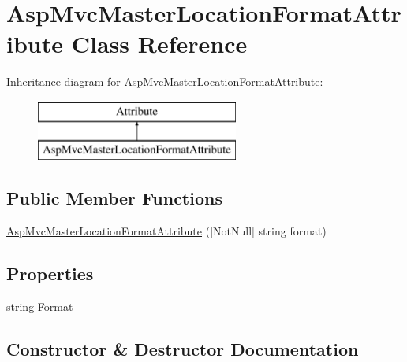 \hypertarget{class_asp_mvc_master_location_format_attribute}{}\section{Asp\+Mvc\+Master\+Location\+Format\+Attribute Class Reference}
\label{class_asp_mvc_master_location_format_attribute}
Inheritance diagram for Asp\+Mvc\+Master\+Location\+Format\+Attribute\+:\begin{figure}[H]
\begin{center}
\leavevmode
\includegraphics[height=2.000000cm]{class_asp_mvc_master_location_format_attribute}
\end{center}
\end{figure}
\subsection*{Public Member Functions}
\begin{DoxyCompactItemize}
\item 
\mbox{\hyperlink{class_asp_mvc_master_location_format_attribute_ad4b5cef1f84fb995a4c6ac2c8e1ae206}{Asp\+Mvc\+Master\+Location\+Format\+Attribute}} (\mbox{[}Not\+Null\mbox{]} string format)
\end{DoxyCompactItemize}
\subsection*{Properties}
\begin{DoxyCompactItemize}
\item 
string \mbox{\hyperlink{class_asp_mvc_master_location_format_attribute_a12e48477c571f14556915ebdef251912}{Format}}
\end{DoxyCompactItemize}


\subsection{Constructor \& Destructor Documentation}
\mbox{\label{class_asp_mvc_master_location_format_attribute_ad4b5cef1f84fb995a4c6ac2c8e1ae206}} 
